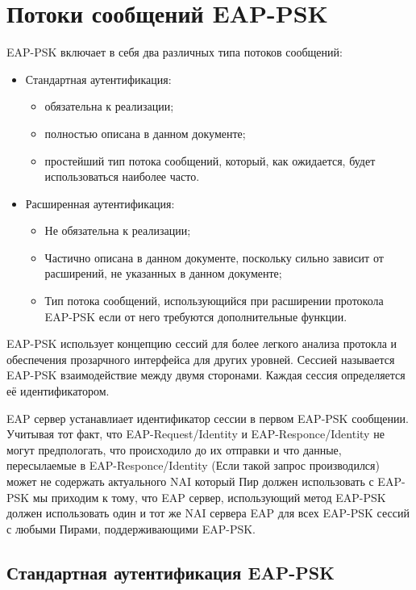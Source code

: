 \newpage
\section{Потоки сообщений EAP-PSK}

EAP-PSK включает в себя два различных типа потоков сообщений:

\begin{itemize}
\item Стандартная аутентификация:
\begin{itemize}
\item обязательна к реализации;
\item полностью описана в данном документе;
\item простейший тип потока сообщений, который, как ожидается, будет использоваться наиболее часто.
\end{itemize}
\item Расширенная аутентификация:
\begin{itemize}
\item Не обязательна к реализации;
\item Частично описана в данном документе, поскольку сильно зависит от расширений, не указанных в данном документе;
\item Тип потока сообщений, использующийся при расширении протокола EAP-PSK если от него требуются дополнительные функции.
\end{itemize}
\end{itemize}

EAP-PSK использует концепцию сессий для более легкого анализа протокла и обеспечения прозарчного интерфейса для других уровней. Сессией называется EAP-PSK взаимодействие между двумя сторонами. Каждая сессия определяется её идентификатором.

EAP сервер устанавлиает идентификатор сессии в первом EAP-PSK сообщении. Учитывая тот факт, что EAP-Request/Identity и EAP-Responce/Identity не могут предпологать, что происходило до их отправки и что данные, пересылаемые в EAP-Responce/Identity (Если такой запрос производился) может не содержать актуального NAI который Пир должен использовать с EAP-PSK мы приходим к тому, что EAP сервер, использующий метод EAP-PSK должен использовать один и тот же NAI сервера EAP для всех EAP-PSK сессий с любыми Пирами, поддерживающими EAP-PSK.

\subsection{Стандартная аутентификация EAP-PSK}

